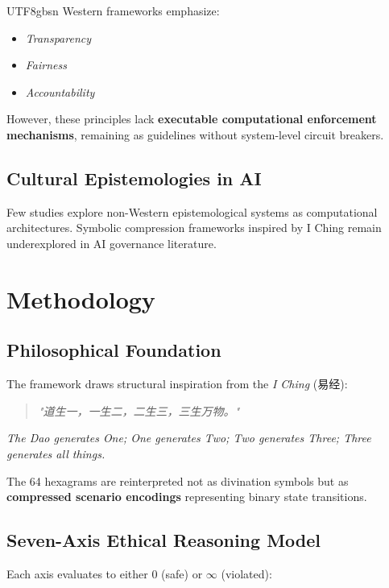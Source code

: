 \documentclass[conference]{IEEEtran}
\begin{document}
\begin{CJK}{UTF8}{gbsn}
Western frameworks emphasize:
\begin{itemize}
    \item \textit{Transparency}
    \item \textit{Fairness}
    \item \textit{Accountability}
\end{itemize}

However, these principles lack \textbf{executable computational enforcement mechanisms}, remaining as guidelines without system-level circuit breakers.

\subsection{Cultural Epistemologies in AI}

Few studies explore non-Western epistemological systems as computational architectures. Symbolic compression frameworks inspired by I Ching remain underexplored in AI governance literature.

\section{Methodology}

\subsection{Philosophical Foundation}

The framework draws structural inspiration from the \textit{I Ching} (易经):

\begin{quote}
\textit{"道生一，一生二，二生三，三生万物。"}
\end{quote}

\textit{The Dao generates One; One generates Two; Two generates Three; Three generates all things.}

The 64 hexagrams are reinterpreted not as divination symbols but as \textbf{compressed scenario encodings} representing binary state transitions.

\subsection{Seven-Axis Ethical Reasoning Model}

Each axis evaluates to either $0$ (safe) or $\infty$ (violated):


\end{CJK}
\end{document}
